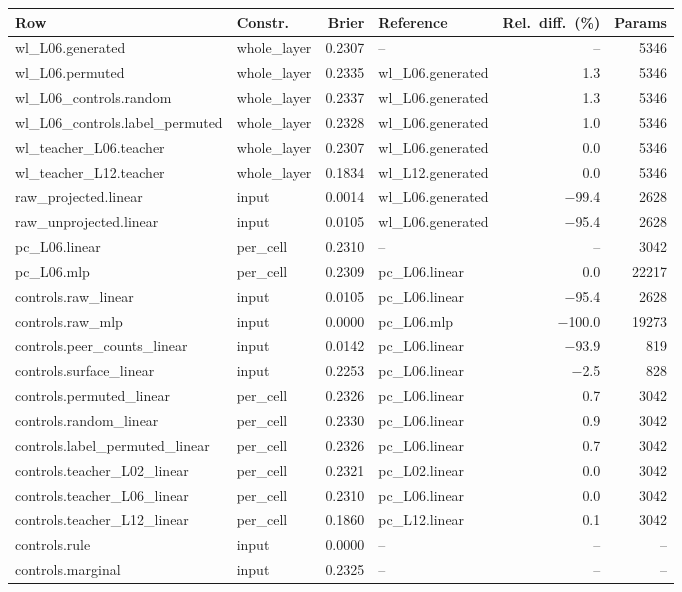 \begin{tabular}{llrlrr}
\toprule
Row & Constr. & Brier & Reference & Rel.\ diff.\ (\%) & Params \\
\midrule
wl\_L06.generated & whole\_layer & 0.2307 & -- & -- & 5346 \\
wl\_L06.permuted & whole\_layer & 0.2335 & wl\_L06.generated & 1.3 & 5346 \\
wl\_L06\_controls.random & whole\_layer & 0.2337 & wl\_L06.generated & 1.3 & 5346 \\
wl\_L06\_controls.label\_permuted & whole\_layer & 0.2328 & wl\_L06.generated & 1.0 & 5346 \\
wl\_teacher\_L06.teacher & whole\_layer & 0.2307 & wl\_L06.generated & 0.0 & 5346 \\
wl\_teacher\_L12.teacher & whole\_layer & 0.1834 & wl\_L12.generated & 0.0 & 5346 \\
raw\_projected.linear & input & 0.0014 & wl\_L06.generated & \ensuremath{-}99.4 & 2628 \\
raw\_unprojected.linear & input & 0.0105 & wl\_L06.generated & \ensuremath{-}95.4 & 2628 \\
pc\_L06.linear & per\_cell & 0.2310 & -- & -- & 3042 \\
pc\_L06.mlp & per\_cell & 0.2309 & pc\_L06.linear & 0.0 & 22217 \\
controls.raw\_linear & input & 0.0105 & pc\_L06.linear & \ensuremath{-}95.4 & 2628 \\
controls.raw\_mlp & input & 0.0000 & pc\_L06.mlp & \ensuremath{-}100.0 & 19273 \\
controls.peer\_counts\_linear & input & 0.0142 & pc\_L06.linear & \ensuremath{-}93.9 & 819 \\
controls.surface\_linear & input & 0.2253 & pc\_L06.linear & \ensuremath{-}2.5 & 828 \\
controls.permuted\_linear & per\_cell & 0.2326 & pc\_L06.linear & 0.7 & 3042 \\
controls.random\_linear & per\_cell & 0.2330 & pc\_L06.linear & 0.9 & 3042 \\
controls.label\_permuted\_linear & per\_cell & 0.2326 & pc\_L06.linear & 0.7 & 3042 \\
controls.teacher\_L02\_linear & per\_cell & 0.2321 & pc\_L02.linear & 0.0 & 3042 \\
controls.teacher\_L06\_linear & per\_cell & 0.2310 & pc\_L06.linear & 0.0 & 3042 \\
controls.teacher\_L12\_linear & per\_cell & 0.1860 & pc\_L12.linear & 0.1 & 3042 \\
controls.rule & input & 0.0000 & -- & -- & -- \\
controls.marginal & input & 0.2325 & -- & -- & -- \\
\bottomrule
\end{tabular}
